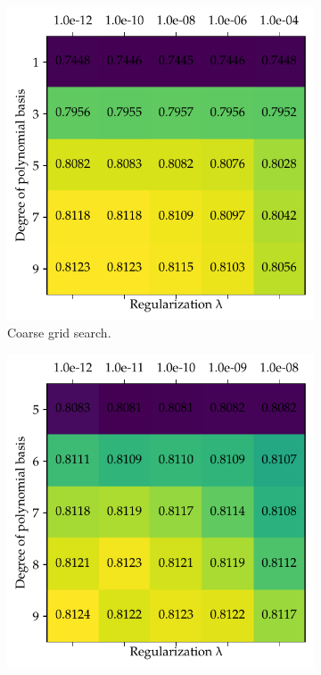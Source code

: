 \documentclass[11pt, a4paper, twocolumn]{article}
\begin{document}
\begin{figure}[htp]
    \centering
    \begin{subfigure}[b]{0.49\columnwidth}
         \centering
         \includegraphics[width=\textwidth]{figures/ridge_regression_gridsearch_coarse.pdf}
         \caption{Coarse grid search.}
     \end{subfigure}
     \hfill
     \begin{subfigure}[b]{0.49\columnwidth}
         \centering
         \includegraphics[width=\textwidth]{figures/ridge_regression_gridsearch_finer.pdf}

\end{subfigure}
\end{figure}
\end{document}
